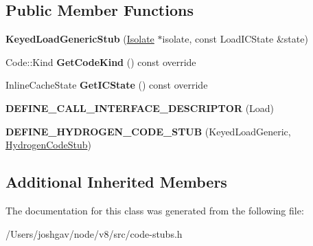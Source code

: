 \subsection*{Public Member Functions}
\begin{DoxyCompactItemize}
\item 
{\bfseries Keyed\+Load\+Generic\+Stub} (\hyperlink{classv8_1_1internal_1_1_isolate}{Isolate} $\ast$isolate, const Load\+I\+C\+State \&state)\hypertarget{classv8_1_1internal_1_1_keyed_load_generic_stub_afbfdfe1c8df31576b51909c4e7053790}{}\label{classv8_1_1internal_1_1_keyed_load_generic_stub_afbfdfe1c8df31576b51909c4e7053790}

\item 
Code\+::\+Kind {\bfseries Get\+Code\+Kind} () const  override\hypertarget{classv8_1_1internal_1_1_keyed_load_generic_stub_a67a3c9311b85356584db73d35676fc11}{}\label{classv8_1_1internal_1_1_keyed_load_generic_stub_a67a3c9311b85356584db73d35676fc11}

\item 
Inline\+Cache\+State {\bfseries Get\+I\+C\+State} () const  override\hypertarget{classv8_1_1internal_1_1_keyed_load_generic_stub_a5c43eea0ce52f8e2d912d799b5593794}{}\label{classv8_1_1internal_1_1_keyed_load_generic_stub_a5c43eea0ce52f8e2d912d799b5593794}

\item 
{\bfseries D\+E\+F\+I\+N\+E\+\_\+\+C\+A\+L\+L\+\_\+\+I\+N\+T\+E\+R\+F\+A\+C\+E\+\_\+\+D\+E\+S\+C\+R\+I\+P\+T\+OR} (Load)\hypertarget{classv8_1_1internal_1_1_keyed_load_generic_stub_a536800173f359a046ffa77a06e762391}{}\label{classv8_1_1internal_1_1_keyed_load_generic_stub_a536800173f359a046ffa77a06e762391}

\item 
{\bfseries D\+E\+F\+I\+N\+E\+\_\+\+H\+Y\+D\+R\+O\+G\+E\+N\+\_\+\+C\+O\+D\+E\+\_\+\+S\+T\+UB} (Keyed\+Load\+Generic, \hyperlink{classv8_1_1internal_1_1_hydrogen_code_stub}{Hydrogen\+Code\+Stub})\hypertarget{classv8_1_1internal_1_1_keyed_load_generic_stub_a4cafc547afc0db3895b5351403a80e8c}{}\label{classv8_1_1internal_1_1_keyed_load_generic_stub_a4cafc547afc0db3895b5351403a80e8c}

\end{DoxyCompactItemize}
\subsection*{Additional Inherited Members}


The documentation for this class was generated from the following file\+:\begin{DoxyCompactItemize}
\item 
/\+Users/joshgav/node/v8/src/code-\/stubs.\+h\end{DoxyCompactItemize}
